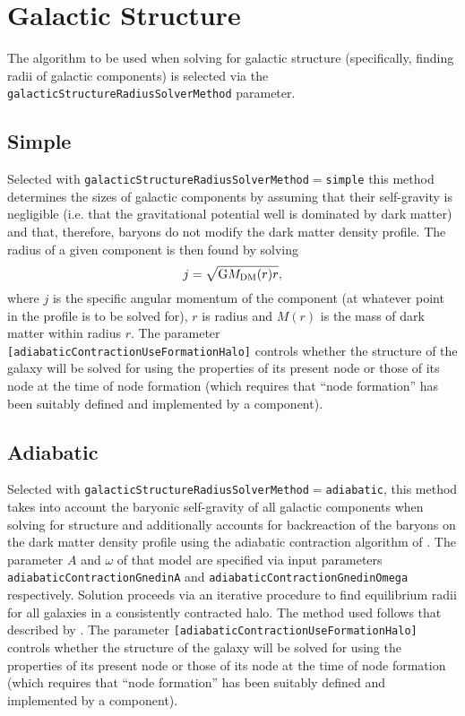 \section{Galactic Structure}

The algorithm to be used when solving for galactic structure (specifically, finding radii of galactic components) is selected via the {\tt galacticStructureRadiusSolverMethod} parameter.

\subsection{Simple}

Selected with {\tt galacticStructureRadiusSolverMethod}$=${\tt simple} this method determines the sizes of galactic components by assuming that their self-gravity is negligible (i.e. that the gravitational potential well is dominated by dark matter) and that, therefore, baryons do not modify the dark matter density profile. The radius of a given \gls{component} is then found by solving
\begin{equation}
 j = \sqrt{\G M_{\rm DM}(r) r},
\end{equation}
where $j$ is the specific angular momentum of the \gls{component} (at whatever point in the profile is to be solved for), $r$ is radius and $M(r)$ is the mass of dark matter within radius $r$. The parameter {\tt [adiabaticContractionUseFormationHalo]} controls whether the structure of the galaxy will be solved for using the properties of its present \gls{node} or those of its \gls{node} at the time of \gls{node} formation (which requires that ``node formation'' has been suitably defined and implemented by a component).

\subsection{Adiabatic}

Selected with {\tt galacticStructureRadiusSolverMethod}$=${\tt adiabatic}, this method takes into account the baryonic self-gravity of all galactic components when solving for structure and additionally accounts for backreaction of the baryons on the dark matter density profile using the adiabatic contraction algorithm of \cite{gnedin_response_2004}. The parameter $A$ and $\omega$ of that model are specified via input parameters {\tt adiabaticContractionGnedinA} and {\tt adiabaticContractionGnedinOmega} respectively. Solution proceeds via an iterative procedure to find equilibrium radii for all galaxies in a consistently contracted halo. The method used follows that described by \cite{benson_galaxy_2010}. The parameter {\tt [adiabaticContractionUseFormationHalo]} controls whether the structure of the galaxy will be solved for using the properties of its present \gls{node} or those of its \gls{node} at the time of \gls{node} formation (which requires that ``node formation'' has been suitably defined and implemented by a component).

